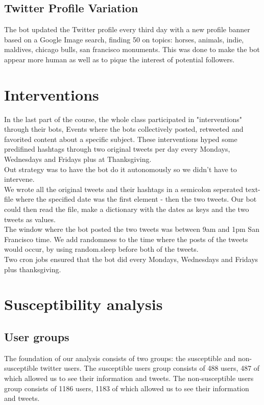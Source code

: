 \documentclass[10pt]{IEEEtran}
\begin{document}
\subsection{Twitter Profile Variation}
The bot updated the Twitter profile every third day with a new profile banner based on a Google Image search, finding 50 on topics: horses, animals, indie, maldives, chicago bulls, san francisco monuments. This was done to make the bot appear more human as well as to pique the interest of potential followers.

\section{Interventions}
In the last part of the course, the whole class participated in "interventions" through their bots, Events where the bots collectively posted, retweeted and favorited content about a specific subject. These interventions hyped some predifined hashtags through two original tweets per day every Mondays, Wednesdays and Fridays plus at Thanksgiving. \\
Out strategy was to have the bot do it autonomously so we didn't have to intervene. \\

We wrote all the original tweets and their hashtags in a semicolon seperated text-file where the specified date was the first element - then the two tweets. Our bot could then read the file, make a dictionary with the dates as keys and the two tweets as values. \\

The window where the bot posted the two tweets was between 9am and 1pm San Francisco time. We add randomness to the time where the posts of the tweets would occur, by using random.sleep before both of the tweets.\\
Two cron jobs ensured that the bot did every Mondays, Wednesdays and Fridays plus thanksgiving.

\section{Susceptibility analysis}
\subsection{User groups}
The foundation of our analysis consists of two groups: the susceptible and non-susceptible twitter users. The susceptible users group consists of 488 users, 487 of which allowed us to see their information and tweets. The non-susceptible users group consists of 1186 users, 1183 of which allowed us to see their information and tweets.
\end{document}
